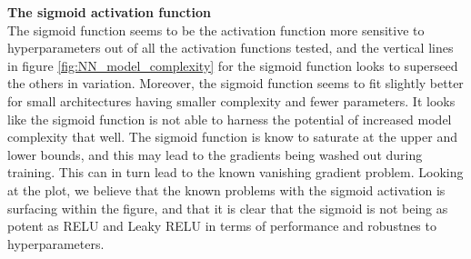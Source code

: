 \documentclass
[twocolumn,
secnumarabic,
nobibnotes,
aps,
prl,
reprint,
groupedaddress,
amsmath,
amssymb
]{revtex4-2}
\begin{document}
\textbf{The sigmoid activation function}\\
The sigmoid function seems to be the activation function more sensitive to hyperparameters out of all the activation functions tested, and the vertical lines in figure \ref{fig:NN_model_complexity} for the sigmoid function looks to superseed the others in variation. Moreover, the sigmoid function seems to fit slightly better for small architectures having smaller complexity and fewer parameters. It looks like the sigmoid function is not able to harness the potential of increased model complexity that well. The sigmoid function is know to saturate at the upper and lower bounds, and this may lead to the gradients being washed out during training. This can in turn lead to the known vanishing gradient problem. Looking at the plot, we believe that the known problems with the sigmoid activation is surfacing within the figure, and that it is clear that the sigmoid is not being as potent as RELU and Leaky RELU in terms of performance and robustnes to hyperparameters.\\\\
\end{document}
